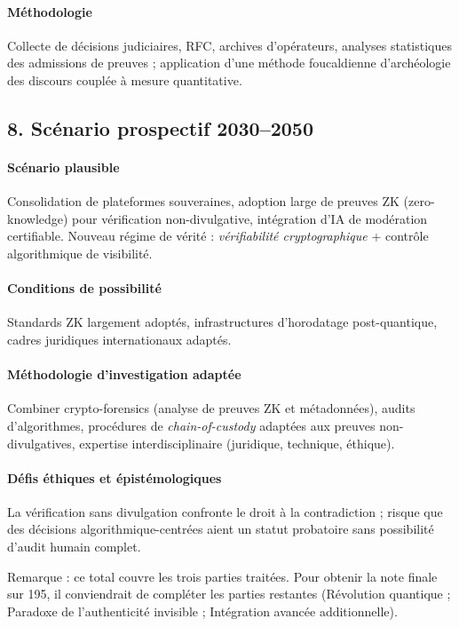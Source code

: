 \documentclass[11pt,a4paper]{article}
\begin{document}
\paragraph{Méthodologie}
Collecte de décisions judiciaires, RFC, archives d'opérateurs, analyses statistiques des admissions de preuves ; application d'une méthode foucaldienne d'archéologie des discours couplée à mesure quantitative.

\subsection{8. Scénario prospectif 2030--2050}
\paragraph{Scénario plausible}
Consolidation de plateformes souveraines, adoption large de preuves ZK (zero-knowledge) pour vérification non-divulgative, intégration d'IA de modération certifiable. Nouveau régime de vérité : \emph{vérifiabilité cryptographique} + contrôle algorithmique de visibilité.

\paragraph{Conditions de possibilité}
Standards ZK largement adoptés, infrastructures d'horodatage post-quantique, cadres juridiques internationaux adaptés.

\paragraph{Méthodologie d'investigation adaptée}
Combiner crypto-forensics (analyse de preuves ZK et métadonnées), audits d'algorithmes, procédures de \emph{chain-of-custody} adaptées aux preuves non-divulgatives, expertise interdisciplinaire (juridique, technique, éthique).

\paragraph{Défis éthiques et épistémologiques}
La vérification sans divulgation confronte le droit à la contradiction ; risque que des décisions algorithmique-centrées aient un statut probatoire sans possibilité d'audit humain complet.

Remarque : ce total couvre les trois parties traitées. Pour obtenir la note finale sur 195, il conviendrait de compléter les parties restantes (Révolution quantique ; Paradoxe de l'authenticité invisible ; Intégration avancée additionnelle).
\end{document}
